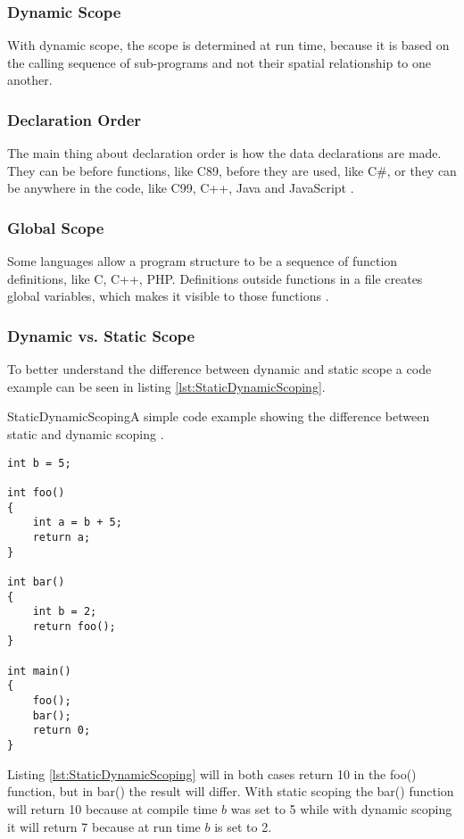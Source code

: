\subsubsection{Dynamic Scope}
With dynamic scope, the scope is determined at run time, because it is based on the calling sequence of sub-programs and not their spatial relationship to one another.

\subsubsection{Declaration Order}
The main thing about declaration order is how the data declarations are made. They can be before functions, like C89, before they are used, like C\#, or they can be anywhere in the code, like C99, C++, Java and JavaScript \citep{sebesta}.

\subsubsection{Global Scope}
Some languages allow a program structure to be a sequence of function definitions, like C, C++, PHP. Definitions outside functions in a file creates global variables, which makes it visible to those functions \citep{sebesta}.

\subsubsection{Dynamic vs. Static Scope}
To better understand the difference between dynamic and static scope a code example can be seen in listing \ref{lst:StaticDynamicScoping}.
\begin{code}{StaticDynamicScoping}{A simple code example showing the difference between static and dynamic scoping \citep{StaticvsDynamic}.}
\begin{lstlisting}
int b = 5;

int foo()
{
	int a = b + 5;
	return a;
}

int bar()
{
	int b = 2;
	return foo();
}

int main()
{
	foo();
	bar();
	return 0;
}
\end{lstlisting}
\end{code}
Listing \ref{lst:StaticDynamicScoping} will in both cases return 10 in the foo() function, but in bar() the result will differ. With static scoping the bar() function will return 10 because at compile time $b$ was set to 5 while with dynamic scoping it will return 7 because at run time $b$ is set to 2.

